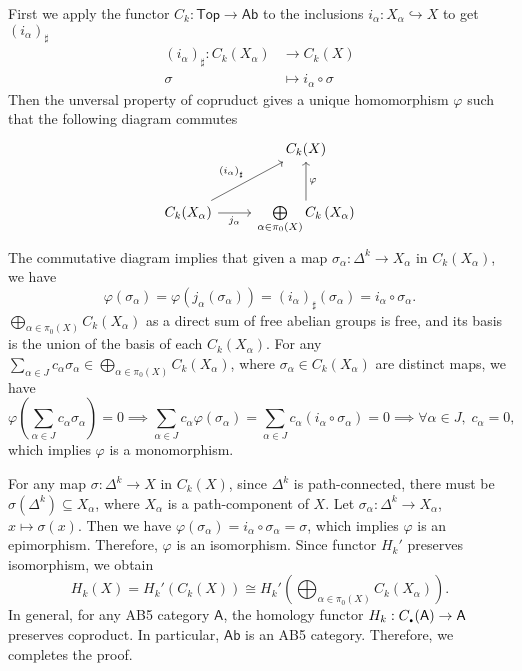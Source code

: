 \documentclass{report}
\begin{document}
\begin{prf}
	First we apply the functor $C_k:\mathsf{Top}\to\mathsf{Ab}$ to the inclusions $i_\alpha:X_\alpha \hookrightarrow X$ to get $\left(i_\alpha\right)_\sharp$
	\begin{align*}
		\left(i_\alpha\right)_\sharp: C_k(X_\alpha) & \longrightarrow C_k(X)           \\
		\sigma                                      & \longmapsto i_\alpha\circ \sigma
	\end{align*}
	Then the unversal property of copruduct gives a unique homomorphism $\varphi$ such that the following diagram commutes
	\begin{equation*}
		\begin{tikzcd}[ampersand replacement=\&]
			\& C_{k}(X) \\ [10pt]
			C_{k}(X_\alpha) \arrow[ru, "\left(i_\alpha \right)_{\sharp}"] \arrow[r, "j_\alpha"']
			\& \bigoplus\limits_{\alpha\in \pi_0(X)} C_k\left(X_\alpha\right) \arrow[u, "\varphi"']
		\end{tikzcd}
	\end{equation*}
	The commutative diagram implies that given a map $\sigma_\alpha:\Delta^k\to X_\alpha$ in $C_k(X_\alpha)$, we have
	\[
		\varphi(\sigma_\alpha)=\varphi(j_\alpha(\sigma_\alpha))=\left(i_\alpha\right)_\sharp(\sigma_\alpha)=i_\alpha\circ\sigma_\alpha.
	\]
	$\bigoplus\limits_{\alpha\in \pi_0(X)} C_k\left(X_\alpha\right)$ as a direct sum of free abelian groups is free, and its basis is the union of the basis of each $C_k\left(X_\alpha\right)$.
	For any $\sum\limits_{\alpha\in J}c_\alpha\sigma_\alpha\in \bigoplus\limits_{\alpha\in \pi_0(X)} C_k\left(X_\alpha\right)$, where $\sigma_\alpha\in C_k\left(X_\alpha\right)$ are distinct maps, we have
	\[
		\varphi\left(\sum\limits_{\alpha\in J}c_\alpha\sigma_\alpha\right)=0\implies \sum_{\alpha\in J}c_\alpha\varphi\left(\sigma_\alpha\right)=\sum_{\alpha\in J} c_\alpha \left(i_\alpha\circ\sigma_\alpha\right)=0\implies \forall \alpha\in J,\;c_\alpha=0,
	\]
	which implies $\varphi$ is a monomorphism.

	For any map $\sigma:\Delta^k\to X$ in $C_k(X)$, since $\Delta^k$ is path-connected, there must be $\sigma(\Delta^k)\subseteq X_\alpha$, where $X_\alpha$ is a path-component of $X$. Let $\sigma_\alpha:\Delta^k\to X_\alpha$, $x\mapsto\sigma(x)$. Then we have $\varphi(\sigma_\alpha)=i_\alpha\circ\sigma_\alpha=\sigma$, which implies $\varphi$ is an epimorphism. Therefore, $\varphi$ is an isomorphism. Since functor $H_k'$ preserves isomorphism, we obtain
	$$
		H_k(X)=H_k'(C_k(X))\cong H_k'\left(\bigoplus_{\alpha\in \pi_0(X)} C_k\left(X_\alpha\right)\right).
	$$
	In general, for any AB5 category $\mathsf{A}$, the homology functor $H_k:C_\text{\hspace{-1pt}\huge$.$\hspace{-1pt}}(\mathsf{A})\to \mathsf{A}$ preserves coproduct. In particular, $\mathsf{Ab}$ is an AB5 category. Therefore, we completes the proof.
\end{prf}
\end{document}
